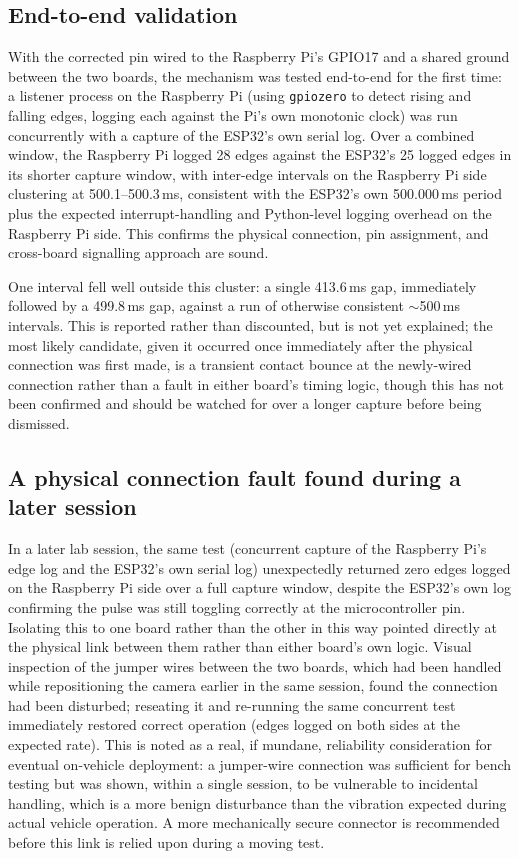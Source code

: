 \subsection{End-to-end validation}

With the corrected pin wired to the Raspberry Pi's GPIO17 and a shared ground between the two boards, the mechanism was tested end-to-end for the first time: a listener process on the Raspberry Pi (using \texttt{gpiozero} to detect rising and falling edges, logging each against the Pi's own monotonic clock) was run concurrently with a capture of the ESP32's own serial log. Over a combined window, the Raspberry Pi logged 28 edges against the ESP32's 25 logged edges in its shorter capture window, with inter-edge intervals on the Raspberry Pi side clustering at 500.1--500.3\,ms, consistent with the ESP32's own 500.000\,ms period plus the expected interrupt-handling and Python-level logging overhead on the Raspberry Pi side. This confirms the physical connection, pin assignment, and cross-board signalling approach are sound.

One interval fell well outside this cluster: a single 413.6\,ms gap, immediately followed by a 499.8\,ms gap, against a run of otherwise consistent $\sim$500\,ms intervals. This is reported rather than discounted, but is not yet explained; the most likely candidate, given it occurred once immediately after the physical connection was first made, is a transient contact bounce at the newly-wired connection rather than a fault in either board's timing logic, though this has not been confirmed and should be watched for over a longer capture before being dismissed.

\subsection{A physical connection fault found during a later session}

In a later lab session, the same test (concurrent capture of the Raspberry Pi's edge log and the ESP32's own serial log) unexpectedly returned zero edges logged on the Raspberry Pi side over a full capture window, despite the ESP32's own log confirming the pulse was still toggling correctly at the microcontroller pin. Isolating this to one board rather than the other in this way pointed directly at the physical link between them rather than either board's own logic. Visual inspection of the jumper wires between the two boards, which had been handled while repositioning the camera earlier in the same session, found the connection had been disturbed; reseating it and re-running the same concurrent test immediately restored correct operation (edges logged on both sides at the expected rate). This is noted as a real, if mundane, reliability consideration for eventual on-vehicle deployment: a jumper-wire connection was sufficient for bench testing but was shown, within a single session, to be vulnerable to incidental handling, which is a more benign disturbance than the vibration expected during actual vehicle operation. A more mechanically secure connector is recommended before this link is relied upon during a moving test.

